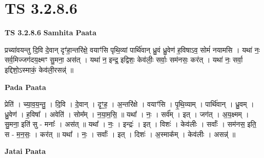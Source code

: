 \documentclass[17pt]{extarticle}
\begin{document}

\section{ TS 3.2.8.6 }

\textbf{TS 3.2.8.6 } \newline
\textbf{Samhita Paata} \newline

प्रच्या॑वयन्तु दि॒वि दे॒वान् दृꣳ॑हा॒न्तरि॑क्षे॒ वयाꣳ॑सि पृथि॒व्यां पार्थि॑वान् ध्रु॒वं ध्रु॒वेण॑ ह॒विषाऽव॒ सोमं॑ नयामसि । यथा॑ नः॒ सर्व॒मिज्जग॑दय॒क्ष्मꣳ सु॒मना॒ अस॑त् । यथा॑ न॒ इन्द्र॒ इद्विशः॒ केव॑लीः॒ सर्वाः॒ सम॑नसः॒ कर॑त् । यथा॑ नः॒ सर्वा॒ इद्दिशो॒ऽस्माकं॒ केव॑ली॒रसन्न्॑ ॥ \newline

\textbf{Pada Paata} \newline

प्रेति॑ । च्या॒व॒य॒न्तु॒ । दि॒वि । दे॒वान् । दृꣳ॒॒ह॒ । अ॒न्तरि॑क्षे । वयाꣳ॑सि । पृ॒थि॒व्याम् । पार्थि॑वान् । ध्रु॒वम् । ध्रु॒वेण॑ । ह॒विषा᳚ । अवेति॑ । सोम᳚म् । न॒या॒म॒सि॒ ॥ यथा᳚ । नः॒ । सर्व᳚म् । इत् । जग॑त् । अ॒य॒क्ष्मम् । सु॒मना॒ इति॑ सु - मनाः᳚ । अस॑त् ॥ यथा᳚ । नः॒ । इन्द्रः॑ । इत् । विशः॑ । केव॑लीः । सर्वाः᳚ । सम॑नस॒ इति॒ स - म॒न॒सः॒ । कर॑त् ॥ यथा᳚ । नः॒ । सर्वाः᳚ । इत् । दिशः॑ । अ॒स्माक᳚म् । केव॑लीः । असन्न्॑ ॥  \newline



\textbf{Jatai Paata} \newline
\end{document}
